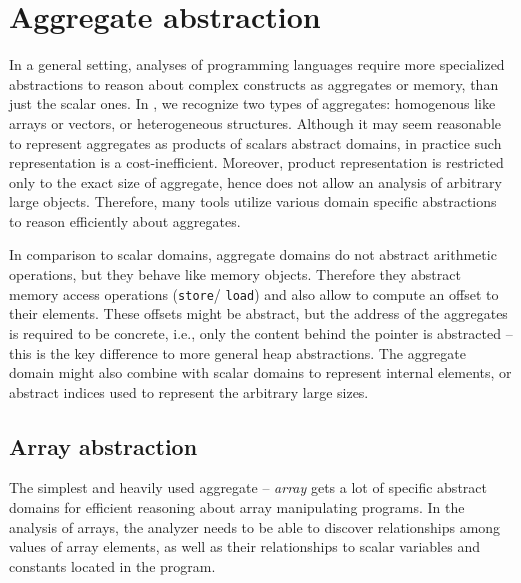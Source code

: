 

\section{Aggregate abstraction}

In a general setting, analyses of programming languages require more
specialized abstractions to reason about complex constructs as aggregates or
memory, than just the scalar ones. In \llvm, we recognize two types of
aggregates: homogenous like arrays or vectors, or heterogeneous structures.
Although it may seem reasonable to represent aggregates as products of scalars
abstract domains, in practice such representation is a cost-inefficient.
Moreover, product representation is restricted only to the exact size of
aggregate, hence does not allow an analysis of arbitrary large objects.
Therefore, many tools utilize various domain specific abstractions to reason
efficiently about aggregates.

In comparison to scalar domains, aggregate domains do not abstract arithmetic
operations, but they behave like memory objects. Therefore they abstract memory
access operations (\texttt{store}/ \texttt{load}) and also allow to compute an
offset to their elements. These offsets might be abstract, but the address of
the aggregates is required to be concrete, i.e., only the content behind the
pointer is abstracted -- this is the key difference to more general heap
abstractions. The aggregate domain might also combine with scalar domains to
represent internal elements, or abstract indices used to represent the
arbitrary large sizes.

\subsection{Array abstraction}

The simplest and heavily used aggregate -- \emph{array} gets a lot of specific
abstract domains for efficient reasoning about array manipulating programs. In
the analysis of arrays, the analyzer needs to be able to discover relationships
among values of array elements, as well as their relationships to scalar
variables and constants located in the program.

